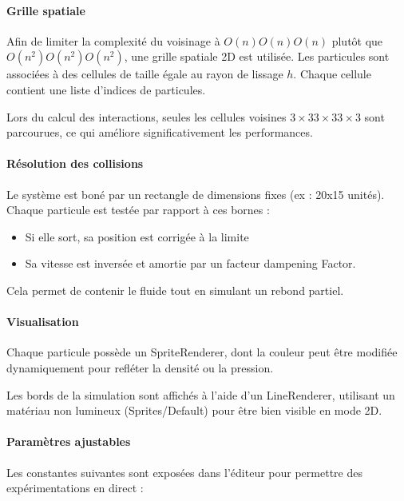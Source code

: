 \documentclass{article}
\begin{document}
\paragraph{Grille spatiale}

Afin de limiter la complexité du voisinage à \(O(n)O(n)O(n)\) plutôt que \(O(n^2)O(n^2)O(n^2)\), une grille spatiale 2D est utilisée. Les particules sont associées à des cellules de taille égale au rayon de lissage \(h\). Chaque cellule contient une liste d’indices de particules.

Lors du calcul des interactions, seules les cellules voisines \(3×33 \times 33×3\) sont parcourues, ce qui améliore significativement les performances.

\paragraph{Résolution des collisions}

Le système est boné par un rectangle de dimensions fixes (ex : 20x15 unités). Chaque particule est testée par rapport à ces bornes :

\begin{itemize}
    \item Si elle sort, sa position est corrigée à la limite
    \item Sa vitesse est inversée et amortie par un facteur dampening Factor.
\end{itemize}

Cela permet de contenir le fluide tout en simulant un rebond partiel.

\paragraph{Visualisation}


Chaque particule possède un SpriteRenderer, dont la couleur peut être modifiée dynamiquement pour refléter la densité ou la pression.

Les bords de la simulation sont affichés à l’aide d’un LineRenderer, utilisant un matériau non lumineux (Sprites/Default) pour être bien visible en mode 2D.

\paragraph{Paramètres ajustables}

Les constantes suivantes sont exposées dans l’éditeur pour permettre des expérimentations en direct :
\end{document}
